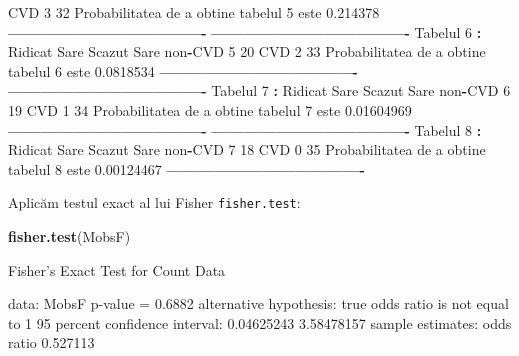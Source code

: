 \documentclass[]{article}
\newenvironment{Shaded}{\begin{snugshade}}{\end{snugshade}}
\newcommand{\KeywordTok}[1]{\textcolor[rgb]{0.13,0.29,0.53}{\textbf{#1}}}
\newcommand{\DecValTok}[1]{\textcolor[rgb]{0.00,0.00,0.81}{#1}}
\newcommand{\FloatTok}[1]{\textcolor[rgb]{0.00,0.00,0.81}{#1}}
\newcommand{\StringTok}[1]{\textcolor[rgb]{0.31,0.60,0.02}{#1}}
\newcommand{\OperatorTok}[1]{\textcolor[rgb]{0.81,0.36,0.00}{\textbf{#1}}}
\newcommand{\NormalTok}[1]{#1}
\begin{document}
\begin{Shaded}
\begin{Highlighting}[]
\NormalTok{CVD                }\DecValTok{3}          \DecValTok{32}
\NormalTok{Probabilitatea de a obtine tabelul  }\DecValTok{5}\NormalTok{  este  }\FloatTok{0.214378} 
\OperatorTok{-------------------------------------}
\OperatorTok{-------------------------------------}
\NormalTok{Tabelul  }\DecValTok{6}  \OperatorTok{:}
\StringTok{        }\NormalTok{Ridicat Sare Scazut Sare}
\NormalTok{non}\OperatorTok{-}\NormalTok{CVD            }\DecValTok{5}          \DecValTok{20}
\NormalTok{CVD                }\DecValTok{2}          \DecValTok{33}
\NormalTok{Probabilitatea de a obtine tabelul  }\DecValTok{6}\NormalTok{  este  }\FloatTok{0.0818534} 
\OperatorTok{-------------------------------------}
\OperatorTok{-------------------------------------}
\NormalTok{Tabelul  }\DecValTok{7}  \OperatorTok{:}
\StringTok{        }\NormalTok{Ridicat Sare Scazut Sare}
\NormalTok{non}\OperatorTok{-}\NormalTok{CVD            }\DecValTok{6}          \DecValTok{19}
\NormalTok{CVD                }\DecValTok{1}          \DecValTok{34}
\NormalTok{Probabilitatea de a obtine tabelul  }\DecValTok{7}\NormalTok{  este  }\FloatTok{0.01604969} 
\OperatorTok{-------------------------------------}
\OperatorTok{-------------------------------------}
\NormalTok{Tabelul  }\DecValTok{8}  \OperatorTok{:}
\StringTok{        }\NormalTok{Ridicat Sare Scazut Sare}
\NormalTok{non}\OperatorTok{-}\NormalTok{CVD            }\DecValTok{7}          \DecValTok{18}
\NormalTok{CVD                }\DecValTok{0}          \DecValTok{35}
\NormalTok{Probabilitatea de a obtine tabelul  }\DecValTok{8}\NormalTok{  este  }\FloatTok{0.00124467} 
\OperatorTok{-------------------------------------}
\end{Highlighting}
\end{Shaded}

Aplicăm testul exact al lui Fisher \texttt{fisher.test}:

\begin{Shaded}
\begin{Highlighting}[]
\KeywordTok{fisher.test}\NormalTok{(MobsF)}

\NormalTok{    Fisher}\StringTok{'s Exact Test for Count Data}

\StringTok{data:  MobsF}
\StringTok{p-value = 0.6882}
\StringTok{alternative hypothesis: true odds ratio is not equal to 1}
\StringTok{95 percent confidence interval:}
\StringTok{ 0.04625243 3.58478157}
\StringTok{sample estimates:}
\StringTok{odds ratio }
\StringTok{  0.527113 }
\end{Highlighting}
\end{Shaded}
\end{document}
